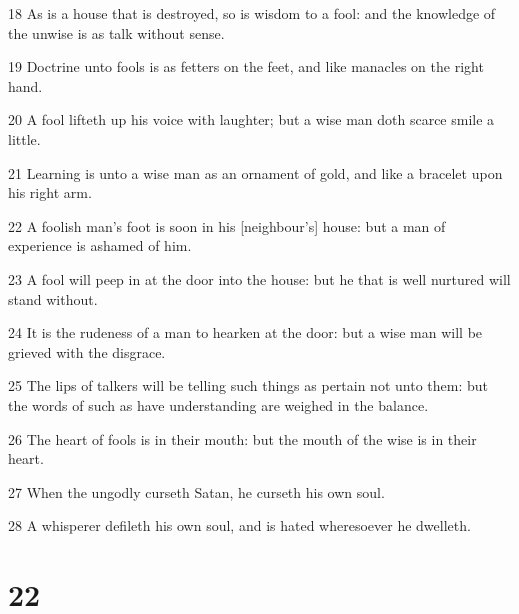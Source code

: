 \par 18 As is a house that is destroyed, so is wisdom to a fool: and the knowledge of the unwise is as talk without sense.
\par 19 Doctrine unto fools is as fetters on the feet, and like manacles on the right hand.
\par 20 A fool lifteth up his voice with laughter; but a wise man doth scarce smile a little.
\par 21 Learning is unto a wise man as an ornament of gold, and like a bracelet upon his right arm.
\par 22 A foolish man's foot is soon in his [neighbour's] house: but a man of experience is ashamed of him.
\par 23 A fool will peep in at the door into the house: but he that is well nurtured will stand without.
\par 24 It is the rudeness of a man to hearken at the door: but a wise man will be grieved with the disgrace.
\par 25 The lips of talkers will be telling such things as pertain not unto them: but the words of such as have understanding are weighed in the balance.
\par 26 The heart of fools is in their mouth: but the mouth of the wise is in their heart.
\par 27 When the ungodly curseth Satan, he curseth his own soul.
\par 28 A whisperer defileth his own soul, and is hated wheresoever he dwelleth.

\chapter{22}

